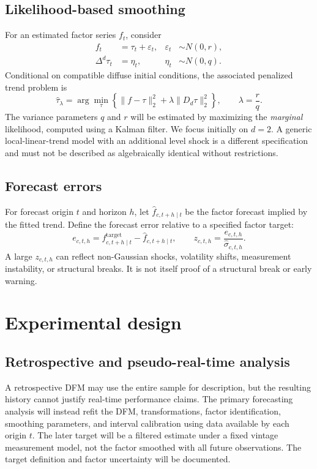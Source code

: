 \documentclass[11pt]{article}
\begin{document}
\subsection{Likelihood-based smoothing}
For an estimated factor series $f_t$, consider
\begin{align}
 f_t &= \tau_t+\varepsilon_t,
       &\varepsilon_t&\sim N(0,r),\\
 \Delta^d\tau_t&=\eta_t,
       &\eta_t&\sim N(0,q).
\end{align}
Conditional on compatible diffuse initial conditions, the associated
penalized trend problem is
\begin{equation}
\widehat{\tau}_\lambda
=\arg\min_{\tau}
\left\{\|f-\tau\|_2^2+
\lambda\|D_d\tau\|_2^2\right\},
\qquad \lambda=\frac{r}{q}.
\end{equation}
The variance parameters $q$ and $r$ will be estimated by maximizing the
\emph{marginal} likelihood, computed using a Kalman filter.
We focus initially on $d=2$. A generic local-linear-trend model
with an additional level shock is a different specification and must
not be described as algebraically identical without restrictions.

\subsection{Forecast errors}
For forecast origin $t$ and horizon $h$, let
$\widehat f_{c,t+h\mid t}$ be the factor forecast implied by the fitted
trend. Define the forecast error relative to a specified factor target:
\begin{equation}
e_{c,t,h} =
f^{\mathrm{target}}_{c,t+h\mid t}
- \widehat f_{c,t+h\mid t},
\qquad
z_{c,t,h}=\frac{e_{c,t,h}}{\widehat\sigma_{c,t,h}}.
\end{equation}
A large $z_{c,t,h}$ can reflect non-Gaussian shocks, volatility shifts,
measurement instability, or structural breaks. It is not itself proof
of a structural break or early warning.

\section{Experimental design}
\subsection{Retrospective and pseudo-real-time analysis}
A retrospective DFM may use the entire sample for description, but the
resulting history cannot justify real-time performance claims.
The primary forecasting analysis will instead refit the DFM,
transformations, factor identification, smoothing parameters,
and interval calibration using data available by each origin $t$.
The later target will be a filtered estimate under a fixed vintage
measurement model, not the factor smoothed with all future observations.
The target definition and factor uncertainty will be documented.
\end{document}
